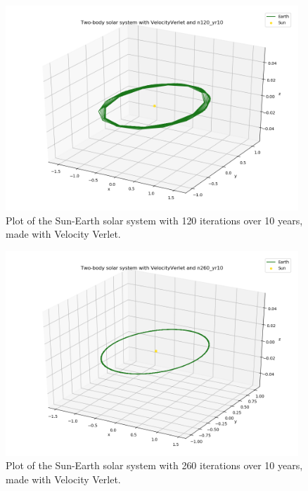 \documentclass{article}
\begin{document}
    \begin{figure}[H]
        \centering
        \includegraphics[width = 11cm]{img/plot3D_S_E_V_n120_yr10.png}
        \caption{Plot of the Sun-Earth solar system with 120 iterations over 10 years, made with Velocity Verlet. }
        \label{fig:plot3D_S_E_V_n120_yr10}
    \end{figure}

    \begin{figure}[H]
        \centering
        \includegraphics[width = 11cm]{img/plot3D_S_E_V_n260_yr10.png}
        \caption{Plot of the Sun-Earth solar system with 260 iterations over 10 years, made with Velocity Verlet. }
        \label{fig:plot3D_S_E_V_n260_yr10}
    \end{figure}
\end{document}
